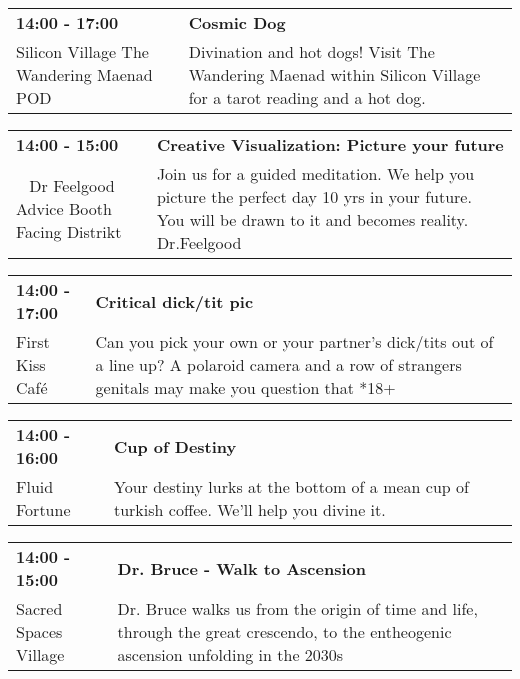 \begin{tabular}{ p{1in} p{2.2in} }
    \textbf{14:00 - 17:00} & \textbf{Cosmic Dog} \\
    Silicon Village \newline The Wandering Maenad POD & Divination and hot dogs! Visit The Wandering Maenad within Silicon Village for a tarot reading and a hot dog. \\
    \hline 
\end{tabular}
    
\begin{tabular}{ p{1in} p{2.2in} }
    \textbf{14:00 - 15:00} & \textbf{Creative Visualization: Picture your future} \\
    ~ \newline Dr Feelgood Advice Booth Facing Distrikt & Join us for a guided meditation. We help you picture the perfect day 10 yrs in your future. You will be drawn to it and becomes reality.
Dr.Feelgood \\
    \hline 
\end{tabular}
    
\begin{tabular}{ p{1in} p{2.2in} }
    \textbf{14:00 - 17:00} & \textbf{Critical dick/tit pic} \\
    First Kiss Caf\'e \newline  & Can you pick your own or your partner's dick/tits out of a line up?  A polaroid camera and a row of strangers genitals may make you question that *18+ \\
    \hline 
\end{tabular}
    
\begin{tabular}{ p{1in} p{2.2in} }
    \textbf{14:00 - 16:00} & \textbf{Cup of Destiny} \\
    Fluid Fortune \newline  & Your destiny lurks at the bottom of a mean cup of turkish coffee. We'll help you divine it. \\
    \hline 
\end{tabular}
    
\begin{tabular}{ p{1in} p{2.2in} }
    \textbf{14:00 - 15:00} & \textbf{Dr. Bruce - Walk to Ascension} \\
    Sacred Spaces Village \newline  & Dr. Bruce walks us from the origin of time and life, through the great crescendo, to the entheogenic ascension unfolding in the 2030s \\
    \hline 
\end{tabular}
    

